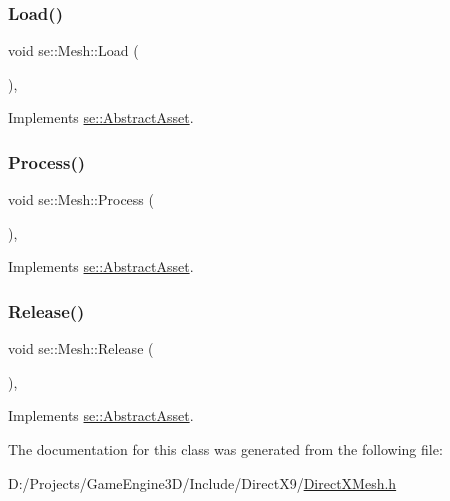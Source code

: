 \subsubsection{\texorpdfstring{Load()}{Load()}}
{\footnotesize\ttfamily void se\+::\+Mesh\+::\+Load (\begin{DoxyParamCaption}{ }\end{DoxyParamCaption})\hspace{0.3cm}{\ttfamily [override]}, {\ttfamily [virtual]}}



Implements \mbox{\hyperlink{classse_1_1_abstract_asset_afb4dff418acf169d81b6ca5d8c1f6548}{se\+::\+Abstract\+Asset}}.

\mbox{\label{classse_1_1_mesh_a1ae42a794ee240b5d6a0dd46aa4ea60d}} 
\subsubsection{\texorpdfstring{Process()}{Process()}}
{\footnotesize\ttfamily void se\+::\+Mesh\+::\+Process (\begin{DoxyParamCaption}{ }\end{DoxyParamCaption})\hspace{0.3cm}{\ttfamily [override]}, {\ttfamily [virtual]}}



Implements \mbox{\hyperlink{classse_1_1_abstract_asset_a1f2fdf75bbeaddec16dc4778063505b7}{se\+::\+Abstract\+Asset}}.

\mbox{\label{classse_1_1_mesh_afde4ccf6665a9b6c7a8f3635dd5139e0}} 
\subsubsection{\texorpdfstring{Release()}{Release()}}
{\footnotesize\ttfamily void se\+::\+Mesh\+::\+Release (\begin{DoxyParamCaption}{ }\end{DoxyParamCaption})\hspace{0.3cm}{\ttfamily [override]}, {\ttfamily [virtual]}}



Implements \mbox{\hyperlink{classse_1_1_abstract_asset_aea97e36f647efdb07a801b6fc468388d}{se\+::\+Abstract\+Asset}}.



The documentation for this class was generated from the following file\+:\begin{DoxyCompactItemize}
\item 
D\+:/\+Projects/\+Game\+Engine3\+D/\+Include/\+Direct\+X9/\mbox{\hyperlink{_direct_x_mesh_8h}{Direct\+X\+Mesh.\+h}}\end{DoxyCompactItemize}
